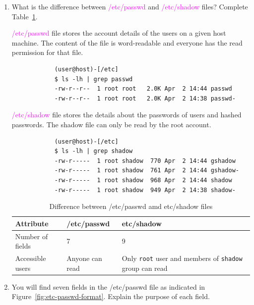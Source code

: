 \documentclass[11pt,letterpaper]{article}
\newenvironment{answer}{\em \color{blue} \begin{adjustwidth}{1cm}{1cm}}{\end{adjustwidth}}
\begin{document}
	\begin{enumerate}
		
		\item What is the difference between \textcolor{magenta}{/etc/passwd} and \textcolor{magenta}{/etc/shadow} files? Complete Table~\ref{tab:difference-passwd-shadow}.
		
		\begin{answer}
			\textcolor{magenta}{/etc/passwd} file stores the account details of the users on a given host machine. The content of the file is word-readable and everyone has the read permission for that file. 
			
			\begin{verbatim}
			(user@host)-[/etc]
			$ ls -lh | grep passwd
			-rw-r--r--  1 root root   2.0K Apr  2 14:44 passwd
			-rw-r--r--  1 root root   2.0K Apr  2 14:38 passwd-
			\end{verbatim}
		
			\textcolor{magenta}{/etc/shadow} file stores the details about the passwords of users and hashed passwords. The shadow file can only be read by the root account.
			
			\begin{verbatim}
			(user@host)-[/etc]
			$ ls -lh | grep shadow
			-rw-r-----  1 root shadow  770 Apr  2 14:44 gshadow
			-rw-r-----  1 root shadow  761 Apr  2 14:44 gshadow-
			-rw-r-----  1 root shadow  968 Apr  2 14:44 shadow
			-rw-r-----  1 root shadow  949 Apr  2 14:38 shadow-
			\end{verbatim}
			
			\begin{table}[h!]
				\caption{Difference between /etc/passwd amd etc/shadow files} \label{tab:difference-passwd-shadow}
				\begin{tabularx}{\columnwidth}{|p{4cm}|X|X|}
					\hline
					\textbf{Attribute} & \textbf{/etc/passwd} & \textbf{etc/shadow} \\
					\hline
					Number of fields & 7 & 9\\\hline
					
					\hline
					Accessible users & Anyone can read& Only {\tt root} user and members of {\tt shadow} group can read \\\hline
				\end{tabularx}
			\end{table}
			
		\end{answer}
		
		
		
		\item You will find seven fields in the /etc/passwd file as indicated in Figure~\ref{fig:etc-passwd-format}. Explain the purpose of each field.
		

\end{enumerate}
\end{document}

